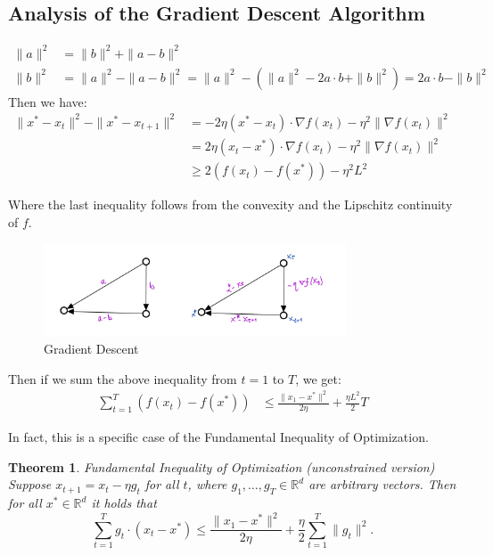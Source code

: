 \documentclass[11pt]{book} %
\newtheorem{theorem}{Theorem}[section]
\begin{document}
\subsection{Analysis of the Gradient Descent Algorithm}

\begin{align*}
    \|a\|^2  &= \|b\|^2 + \|a - b\|^2   \\ 
    \|b\|^2 &= \|a\|^2 - \|a - b\|^2 = \|a\|^2 - ( \|a\|^2 - 2a \cdot b + \|b\|^2  ) = 2 a \cdot b - \|b\|^2
\end{align*}
Then we have:
\begin{align*}
    \| x^* - x_t \|^2 - \| x^* - x_{t+1} \|^2 &= - 2 \eta (x^* - x_t) \cdot \nabla f(x_t) - \eta^2 \| \nabla f(x_t) \|^2 \\
    &= 2 \eta (x_t - x^*) \cdot \nabla f(x_t) - \eta^2 \| \nabla f(x_t) \|^2 \\
    &\geq  2 ( f(x_t) - f(x^*) ) - \eta^2 L^2
\end{align*}

Where the last inequality follows from the convexity and the Lipschitz continuity of $f$. 

\begin{figure}[H]
    \centering
    \includegraphics[width=0.8\textwidth]{Figs/vectors_triangle.jpeg}
    \caption{Gradient Descent}
\end{figure}

Then if we sum the above inequality from $t=1$ to $T$, we get:
\begin{align*}
    \sum_{t=1}^T ( f(x_t) - f(x^*) ) &\leq \frac{\|x_1 - x^*\|^2}{2 \eta} + \frac{\eta L^2}{2} T 
\end{align*}

In fact, this is a specific case of the Fundamental Inequality of Optimization. 

\begin{theorem}{Fundamental Inequality of Optimization (unconstrained version)} \\
    Suppose \( x_{t+1} = x_t - \eta g_t \) for all \( t \), where \( g_1, \ldots, g_T \in \mathbb{R}^d \) are arbitrary vectors. Then for all \( x^* \in \mathbb{R}^d \) it holds that
    \[
    \sum_{t=1}^T g_t \cdot (x_t - x^*) \leq \frac{\|x_1 - x^*\|^2}{2\eta} + \frac{\eta}{2} \sum_{t=1}^T \|g_t\|^2.
    \]
\end{theorem}
    
\end{document}
